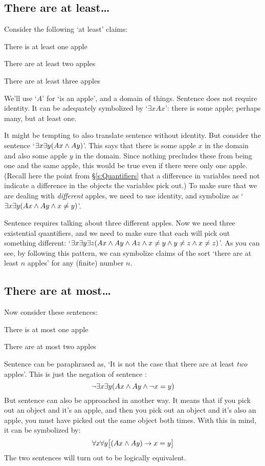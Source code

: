 \subsection{There are at least\ldots}
Consider the following `at least' claims:
\begin{earg}
\item[\ex{atleast1}] There is at least one apple
\item[\ex{atleast2}] There are at least two apples
\item[\ex{atleast3}] There are at least three apples
\end{earg}
We'll use `$A$' for `\blank is an apple', and a domain of things.  Sentence  does not require identity. It can be adequately symbolized by `$\exists x Ax$': there is some apple; perhaps many, but at least one.

It might be tempting to also translate sentence  without identity. But consider the sentence `$\exists x \exists y(Ax \wedge Ay)$'. This says that there is some apple $x$ in the domain and also some apple $y$ in the domain. Since nothing precludes these from being one and the same apple, this would be true even if there were only one apple.  (Recall here the point from \S\ref{s:Quantifiers} that a difference in variables need not indicate a difference in the objects the variables pick out.) To make sure that we are dealing with \emph{different} apples, we need to use identity, and symbolize  as  `$\exists x \exists y(Ax \wedge Ay \wedge x \neq y)$'.

Sentence  requires talking about three different apples. Now we need three existential quantifiers, and we need to make sure that each will pick out something different: `$\exists x \exists y\exists z(Ax \wedge Ay \wedge Az \wedge x \neq y \wedge y \neq z \wedge x \neq z)$'.  As you can see, by following this pattern, we can symbolize claims of the sort `there are at least $n$ apples' for any (finite) number $n$.

\subsection{There are at most\ldots}
Now consider these sentences:
\begin{earg}
	\item[\ex{atmost1}] There is at most one apple
	\item[\ex{atmost2}] There are at most two apples
\end{earg}
Sentence  can be paraphrased as, `It is not the case that there are at least \emph{two} apples'. This is just the negation of sentence :
$$\neg \exists x \exists y(Ax \wedge Ay \wedge \neg x = y)$$
But sentence  can also be approached in another way. It means that if you pick out an object and it's an apple, and then you pick out an object and it's also an apple, you must have picked out the same object both times. With this in mind, it can be symbolized by:
$$\forall x\forall y\bigl[(Ax \wedge Ay) \rightarrow x=y\bigr]$$
The two sentences will turn out to be logically equivalent.

